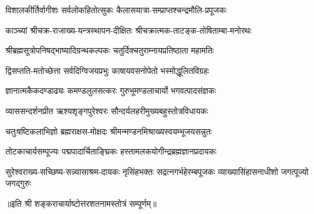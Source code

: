 \twolineshloka
{विशालकीर्तिर्वागीशः सर्वलोकहितोत्सुकः}
{कैलासयात्रा-सम्प्राप्तश्चन्द्रमौलि-प्रपूजकः}

\twolineshloka
{काञ्च्यां श्रीचक्र-राजाख्य-यन्त्रस्थापन-दीक्षितः}
{श्रीचक्रात्मक-ताटङ्क-तोषिताम्बा-मनोरथः}

\twolineshloka
{श्रीब्रह्मसूत्रोपनिषद्भाष्यादिग्रन्थकल्पकः}
{चतुर्दिक्चतुराम्नायप्रतिष्ठाता महामतिः}

\twolineshloka
{द्विसप्तति-मतोच्छेत्ता सर्वदिग्विजयप्रभुः}
{काषायवसनोपेतो भस्मोद्धूलितविग्रहः}

\twolineshloka
{ज्ञानात्मकैकदण्डाढ्यः कमण्डलुलसत्करः}
{गुरुभूमण्डलाचार्यो भगवत्पादसंज्ञकः}

\twolineshloka
{व्याससन्दर्शनप्रीत ऋश्यशृङ्गपुरेश्वरः}
{सौन्दर्यलहरीमुख्यबहुस्तोत्रविधायकः}

\twolineshloka
{चतुःषष्टिकलाभिज्ञो ब्रह्मराक्षस-मोक्षदः}
{श्रीमन्मण्डनमिश्राख्यस्वयम्भूजयसन्नुतः}

\twolineshloka
{तोटकाचार्यसम्पूज्यः पद्मपादार्चिताङ्घ्रिकः}
{हस्तामलकयोगीन्द्रब्रह्मज्ञानप्रदायकः}

\threelineshloka
{सुरेश्वराख्य-सच्छिष्य-सन्न्यासाश्रम-दायकः}
{नृसिंहभक्तः सद्रत्नगर्भहेरम्बपूजकः}
{व्याख्यासिंहासनाधीशो जगत्पूज्यो जगद्गुरुः}

॥इति श्री शङ्कराचार्याष्टोत्तरशतनामस्तोत्रं सम्पूर्णम्॥
